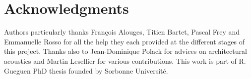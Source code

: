 \documentclass[AMA,STIX1COL]{WileyNJD-v2}
\begin{document}
\section*{Acknowledgments}
Authors particularly thanks Fran\c{c}ois Alouges, Titien Bartet, Pascal Frey and Emmanuelle Rosso for all the help they each provided at the different stages of this project. Thanks also to Jean-Dominique Polack for advices on architectural acoustics and Martin Lesellier for various contributions. This work is part of R. Gueguen PhD thesis founded by Sorbonne Universit\'e.

 







%
%





	

	
		
\end{document}
